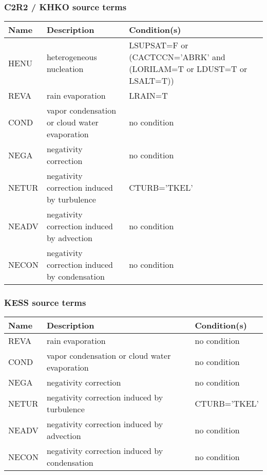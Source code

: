 \subsubsection{C2R2 / KHKO source terms}

\begin{longtable} {|p{}|p{}|p{}|}
\hline
Name & Description & Condition(s) \\
\hline \hline
\endhead
HENU   & heterogeneous nucleation                      & LSUPSAT=F or (CACTCCN='ABRK' and (LORILAM=T or LDUST=T or LSALT=T)) \\\hline
REVA   & rain evaporation                              & LRAIN=T \\\hline
COND   & vapor condensation or cloud water evaporation & no condition \\\hline
NEGA   & negativity correction                         & no condition \\\hline
NETUR  & negativity correction induced by turbulence   & CTURB='TKEL' \\\hline
NEADV  & negativity correction induced by advection    & no condition \\\hline
NECON  & negativity correction induced by condensation & no condition \\\hline
\end{longtable}

\subsubsection{KESS source terms}

\begin{longtable} {|p{}|p{}|p{}|}
\hline
Name & Description & Condition(s) \\
\hline \hline
\endhead
REVA   & rain evaporation                              & no condition \\\hline
COND   & vapor condensation or cloud water evaporation & no condition \\\hline
NEGA   & negativity correction                         & no condition \\\hline
NETUR  & negativity correction induced by turbulence   & CTURB='TKEL' \\\hline
NEADV  & negativity correction induced by advection    & no condition \\\hline
NECON  & negativity correction induced by condensation & no condition \\\hline
\end{longtable}

